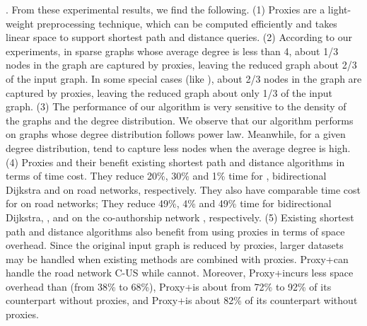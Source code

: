 \vspace{-0.5ex}
.
From these experimental results, we find the following. (1) Proxies are a light-weight preprocessing technique, which can be computed efficiently and takes linear space to support shortest path and distance queries.  (2) According to our experiments, in sparse graphs whose average degree is less than 4, about 1/3 nodes in the graph are captured by proxies, leaving the reduced graph about 2/3 of the input graph. In some special cases (like \dblpone), about 2/3 nodes in the graph are captured by proxies, leaving the reduced graph about only 1/3 of the input graph. (3) The performance of our algorithm is very sensitive to the density of the graphs and the degree distribution. We observe that our algorithm performs on graphs whose degree distribution follows power law. Meanwhile, for a given degree distribution, \dras tend to capture less nodes when the average degree is high. (4) Proxies and their \dras benefit existing shortest path and distance algorithms in terms of time cost. They reduce 20\%, 30\% and 1\% time for \arcflag, bidirectional Dijkstra and \ah on road networks, respectively. They also have comparable time cost for \tnr on road networks; They reduce 49\%, 4\% and 49\% time for bidirectional Dijkstra, \arcflag, and \tnr on the co-authorship network \dblpone, respectively. (5) Existing shortest path and distance algorithms also benefit from using proxies in terms of space overhead. Since the original input graph is reduced by proxies, larger datasets may be handled when existing methods are combined with proxies.  Proxy+\tnr can handle the road network C-US while \tnr cannot. Moreover, Proxy+\arcflag incurs less space overhead than \arcflag (from 38\% to 68\%), Proxy+\tnr is about from 72\% to 92\% of its counterpart without proxies, and Proxy+\ah is about 82\% of its counterpart without proxies.

